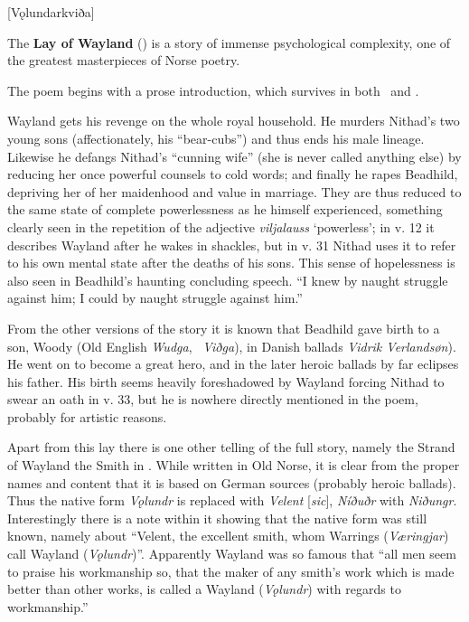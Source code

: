 [Vǫlundarkviða]



The \textbf{Lay of Wayland} (\Volundarkvida) is a story of immense psychological complexity, one of the greatest masterpieces of Norse poetry.

The poem begins with a prose introduction, which survives in both \Regius\ and \AM.



Wayland gets his revenge on the whole royal household. He murders Nithad’s two young sons (affectionately, his “bear-cubs”) and thus ends his male lineage. Likewise he defangs Nithad’s “cunning wife” (she is never called anything else) by reducing her once powerful counsels to cold words; and finally he rapes Beadhild, depriving her of her maidenhood and value in marriage. They are thus reduced to the same state of complete powerlessness as he himself experienced, something clearly seen in the repetition of the adjective \emph{viljalauss} ‘powerless’; in v. 12 it describes Wayland after he wakes in shackles, but in v. 31 Nithad uses it to refer to his own mental state after the deaths of his sons. This sense of hopelessness is also seen in Beadhild’s haunting concluding speech. “I knew by naught struggle against him; I could by naught struggle against him.”

From the other versions of the story it is known that Beadhild gave birth to a son, Woody (Old English \emph{Wudga}, \ThidreksSaga\ \emph{Viðga}), in Danish ballads \emph{Vidrik Verlandsøn}). He went on to become a great hero, and in the later heroic ballads by far eclipses his father. His birth seems heavily foreshadowed by Wayland forcing Nithad to swear an oath in v. 33, but he is nowhere directly mentioned in the poem, probably for artistic reasons.

Apart from this lay there is one other telling of the full story, namely the Strand of Wayland the Smith in \ThidreksSaga. While written in Old Norse, it is clear from the proper names and content that it is based on German sources (probably heroic ballads). Thus the native form \emph{Vǫlundr} is replaced with \emph{Velent} [\emph{sic}], \emph{Níðuðr} with \emph{Niðungr}. Interestingly there is a note within it showing that the native form was still known, namely about “Velent, the excellent smith, whom Warrings (\emph{Væringjar}) call Wayland (\emph{Vǫlundr})”. Apparently Wayland was so famous that “all men seem to praise his workmanship so, that the maker of any smith’s work which is made better than other works, is called a Wayland (\emph{Vǫlundr}) with regards to workmanship.”

